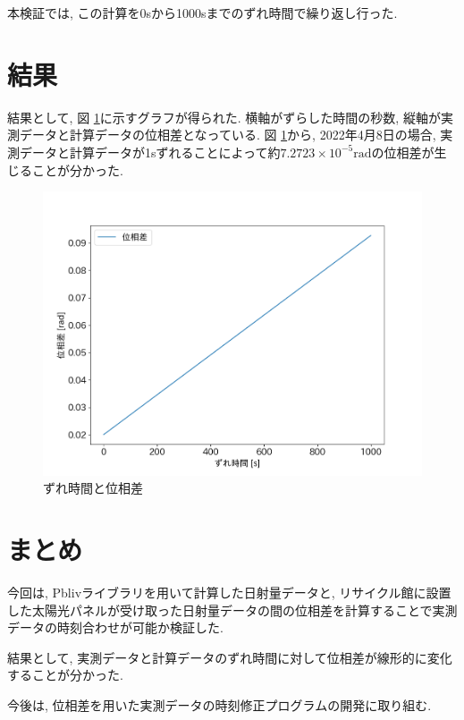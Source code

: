 \documentclass[a4j,12pt,]{jarticle}
\begin{document}
本検証では, この計算を0sから1000sまでのずれ時間で繰り返し行った. 

\section{結果}
結果として, 図 \ref{p2}に示すグラフが得られた. 横軸がずらした時間の秒数, 縦軸が実測データと計算データの位相差となっている. 図 \ref{p2}から, 2022年4月8日の場合, 実測データと計算データが1sずれることによって約$7.2723 \times 10^{-5} \mathrm{rad}$の位相差が生じることが分かった.

\begin{figure}[H]
  \begin{center}
    \includegraphics[width=160mm]{1.png}
    \caption{ずれ時間と位相差}
    \label{p2}
  \end{center}
\end{figure}

\section{まとめ}
今回は, Pblivライブラリを用いて計算した日射量データと, リサイクル館に設置した太陽光パネルが受け取った日射量データの間の位相差を計算することで実測データの時刻合わせが可能か検証した.

結果として, 実測データと計算データのずれ時間に対して位相差が線形的に変化することが分かった.

今後は, 位相差を用いた実測データの時刻修正プログラムの開発に取り組む.
\end{document}
